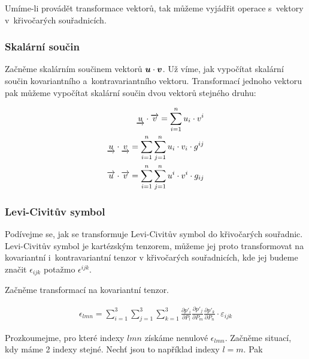 Umíme-li provádět transformace vektorů, tak můžeme vyjádřit operace s~vektory v~křivočarých souřadnicích. 

\subsubsection{Skalární součin}

Začněme skalárním součinem vektorů \(\boldsymbol{u} \cdot \boldsymbol{v}\). Už víme, jak vypočítat skalární součin kovariantního a~kontravariantního vektoru. Transformací jednoho vektoru pak můžeme vypočítat skalární součin dvou vektorů stejného druhu:

\begin{fact}
\begin{equation}
\begin{split}
\underrightarrow{u} \cdot \overrightarrow{v} = \sum_{i=1}^n u_i \cdot v^i \\
\underrightarrow{u} \cdot \underrightarrow{v} = \sum_{i=1}^n \sum_{j=1}^n u_i \cdot v_i \cdot g^{ij} \\
\overrightarrow{u} \cdot \overrightarrow{v} = \sum_{i=1}^n \sum_{j=1}^n u^i \cdot v^i \cdot g_{ij}
\end{split}
\end{equation}
\end{fact}

\subsubsection{Levi-Civitův symbol}

Podívejme se, jak se transformuje Levi-Civitův symbol do křivočarých souřadnic. Levi-Civitův symbol je kartézským tenzorem, můžeme jej proto transformovat na kovariantní i~kontravariantní tenzor v křivočarých souřadnicích, kde jej budeme značit \(\epsilon_{ijk}\) potažmo \(\epsilon^{ijk}\).

Začněme transformací na kovariantní tenzor. 

\begin{equation}
\begin{split}
\epsilon_{lmn} = \sum_{i=1}^3 \sum_{j=1}^3 \sum_{k=1}^3 \frac{\partial p'_i}{\partial P_l} \frac{\partial p'_j}{\partial P_m} \frac{\partial p'_k}{\partial P_n} \cdot \varepsilon_{ijk}
\end{split}
\end{equation}

Prozkoumejme, pro které indexy \(lmn\) získáme nenulové \(\epsilon_{lmn}\). Začněme situací, kdy máme 2 indexy stejné. Nechť jsou to například indexy \(l = m\). Pak

